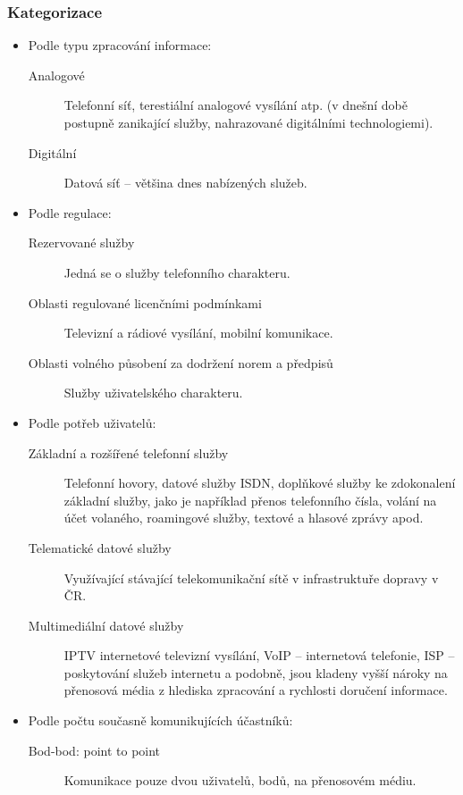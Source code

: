\subsubsection{Kategorizace}
\begin{itemize}
    \item Podle typu zpracování informace:
          \begin{description}
              \item[Analogové] Telefonní síť, terestiální analogové vysílání atp. (v dnešní době postupně zanikající služby, nahrazované digitálními technologiemi).
              \item[Digitální] Datová síť -- většina dnes nabízených služeb.
          \end{description}
    \item Podle regulace:
          \begin{description}
              \item[Rezervované služby] Jedná se o služby telefonního charakteru.
              \item[Oblasti regulované licenčními podmínkami] Televizní a rádiové vysílání, mobilní komunikace.
              \item[Oblasti volného působení za dodržení norem a předpisů] Služby uživatelského charakteru.
          \end{description}
    \item Podle potřeb uživatelů:
          \begin{description}
              \item[Základní a rozšířené telefonní služby] Telefonní hovory, datové služby ISDN, doplňkové služby ke zdokonalení základní služby, jako je například přenos telefonního čísla, volání na účet volaného, roamingové služby, textové a hlasové zprávy apod.
              \item[Telematické datové služby] Využívající stávající telekomunikační sítě v infrastruktuře dopravy v ČR.
              \item[Multimediální datové služby] IPTV internetové televizní vysílání, VoIP -- internetová telefonie, ISP -- poskytování služeb internetu a podobně, jsou kladeny vyšší nároky na přenosová média z hlediska zpracování a rychlosti doručení informace.
          \end{description}
    \item Podle počtu současně komunikujících účastníků:
          \begin{description}
              \item[Bod-bod: point to point] Komunikace pouze dvou uživatelů, bodů, na přenosovém médiu.

\end{description}
\end{itemize}
